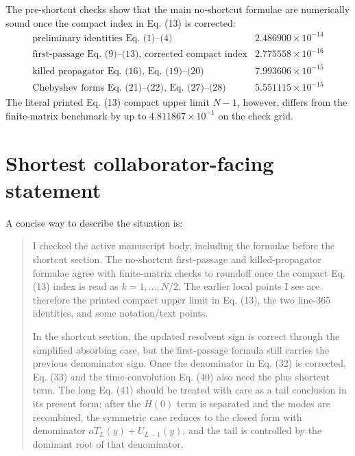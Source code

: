 \documentclass[11pt]{article}
\begin{document}
The pre-shortcut checks show that the main no-shortcut formulae are numerically
sound once the compact index in Eq. (13) is corrected:
\[
\begin{array}{ll}
\text{preliminary identities Eq. (1)--(4)} & 2.486900\times10^{-14}\\
\text{first-passage Eq. (9)--(13), corrected compact index} & 2.775558\times10^{-16}\\
\text{killed propagator Eq. (16), Eq. (19)--(20)} & 7.993606\times10^{-15}\\
\text{Chebyshev forms Eq. (21)--(22), Eq. (27)--(28)} & 5.551115\times10^{-15}
\end{array}
\]
The literal printed Eq. (13) compact upper limit \(N-1\), however, differs from
the finite-matrix benchmark by up to \(4.811867\times10^{-1}\) on the check
grid.

\section*{Shortest collaborator-facing statement}

A concise way to describe the situation is:

\begin{quote}
I checked the active manuscript body, including the formulae before the
shortcut section.  The no-shortcut first-passage and killed-propagator formulae
agree with finite-matrix checks to roundoff once the compact Eq. (13) index is
read as \(k=1,\ldots,N/2\).  The earlier local points I see are therefore the
printed compact upper limit in Eq. (13), the two line-365 identities, and some
notation/text points.

In the shortcut section, the updated resolvent sign is correct through the
simplified absorbing case, but the first-passage formula still carries the previous
denominator sign.  Once the denominator in Eq. (32) is corrected, Eq. (33) and
the time-convolution Eq. (40) also need the plus shortcut term.  The long
Eq. (41) should be treated with care as a tail conclusion in its present form:
after the
\(H(0)\) term is separated and the modes are recombined, the symmetric case
reduces to the closed form with denominator \(aT_L(y)+U_{L-1}(y)\), and the
tail is controlled by the dominant root of that denominator.
\end{quote}
\end{document}
